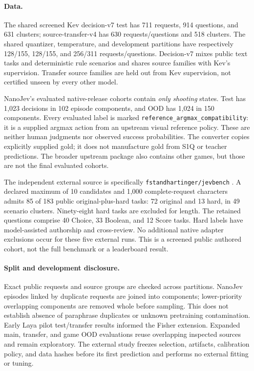 \documentclass[10pt,twocolumn]{article}
\begin{document}
\paragraph{Data.}
The shared screened Kev decision-v7 test has 711 requests, 914
questions, and 631 clusters; source-transfer-v4 has 630 requests/questions
and 518 clusters. The shared quantizer, temperature, and development
partitions have respectively 128/155, 128/155, and 256/311
requests/questions. Decision-v7 mixes public text tasks and deterministic
rule scenarios and shares source families with Kev's supervision.
Transfer source families are held out from Kev supervision, not certified
unseen by every other model.

NanoJev's evaluated native-release cohorts contain \emph{only shooting}
states. Test has 1,023 decisions in 102 episode components, and OOD
has 1,024 in 150 components. Every evaluated label is marked
\texttt{reference\_argmax\_compatibility}: it is a supplied argmax
action from an upstream visual reference policy. These are neither
human judgments nor observed success probabilities. The converter
copies explicitly supplied gold; it does not manufacture gold from
S1Q or teacher predictions. The broader upstream package also contains
other games, but those are not the final evaluated cohorts.

The independent external source is specifically
\texttt{fstandhartinger/jevbench} \cite{standhartinger2026jevbench}.
A declared maximum of 10 candidates and 1,000 complete-request
characters admits 85 of 183 public original-plus-hard tasks:
72 original and 13 hard, in 49 scenario clusters. Ninety-eight hard
tasks are excluded for length. The retained questions comprise
40 Choice, 33 Boolean, and 12 Score tasks. Hard labels have
model-assisted authorship and cross-review. No additional native
adapter exclusions occur for these five external runs.
This is a screened public authored cohort, not the full benchmark
or a leaderboard result.

\paragraph{Split and development disclosure.}
Exact public requests and source groups are checked across partitions.
NanoJev episodes linked by duplicate requests are joined into components;
lower-priority overlapping components are removed whole before sampling.
This does not establish absence of paraphrase duplicates or unknown
pretraining contamination.
Early Laya pilot test/transfer results informed the Fisher extension.
Expanded main, transfer, and game OOD evaluations reuse overlapping
inspected sources and remain exploratory. The external study freezes
selection, artifacts, calibration policy, and data hashes before its
first prediction and performs no external fitting or tuning.
\end{document}
